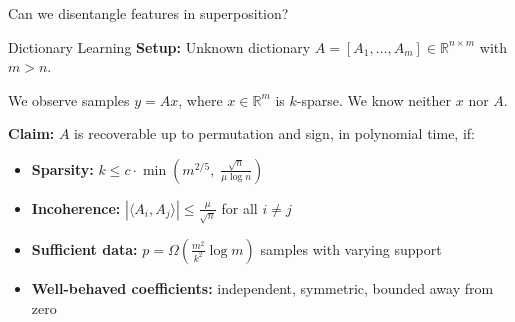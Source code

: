 \begin{frame}{}
\begin{center}
\Large Can we disentangle features in superposition?
\end{center}

\end{frame}

\begin{frame}{Dictionary Learning}
\textbf{Setup:} Unknown dictionary $A = [A_1, \ldots, A_m] \in \mathbb{R}^{n \times m}$ with $m > n$.

We observe samples $y = Ax$, where $x \in \mathbb{R}^m$ is $k$-sparse.
We know neither $x$ nor $A$.

\vspace{0.5em}
\textbf{Claim:} $A$ is recoverable up to permutation and sign, in polynomial time, if:
\begin{itemize}
\item \textbf{Sparsity:} $k \leq c \cdot \min\!\left(m^{2/5},\; \frac{\sqrt{n}}{\mu \log n}\right)$
\item \textbf{Incoherence:} $|\langle A_i, A_j \rangle| \leq \frac{\mu}{\sqrt{n}}$ for all $i \neq j$
\item \textbf{Sufficient data:} $p = \Omega\!\left(\frac{m^2}{k^2} \log m\right)$ samples with varying support
\item \textbf{Well-behaved coefficients:} independent, symmetric, bounded away from zero
\end{itemize}



\end{frame}
